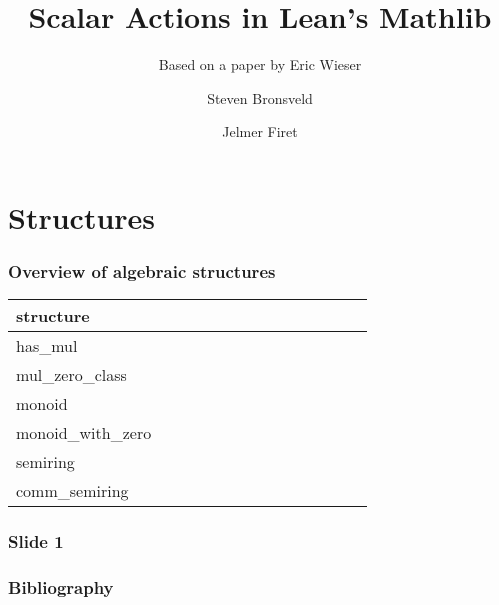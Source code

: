 \documentclass{beamer}
\author{Steven Bronsveld \and Jelmer Firet}
\title[Scalar Actions]{Scalar Actions in Lean's Mathlib}
\subtitle{Based on a paper by Eric Wieser\cite{wieserScalarActionsLean2021}}
\institute[Radboud University Nijmegen]{Radboud University Nijmegen}
\begin{document}
	\begin{frame}[t]
	\titlepage
	\end{frame}

	\section*{Structures} %
	\label{sec:structures}
	\begin{frame}
		\frametitle{Overview of algebraic structures}
		\begin{tabular}{l*{13}{@{}c}}
			structure &  &  &  &  &  &  & &  &  &  &  & \\
			\hline
			has\_mul &&&& \checkmark\\
			mul\_zero\_class &\checkmark&&&\checkmark& \checkmark\\
			monoid &&\checkmark&&\checkmark&&\checkmark& \checkmark\\
			monoid\_with\_zero &\checkmark&\checkmark&&\checkmark&\checkmark&\checkmark& \checkmark\\
			semiring &\checkmark&\checkmark&\checkmark&\checkmark&\checkmark&\checkmark&\checkmark&\checkmark&\checkmark&\checkmark& \checkmark\\
			comm\_semiring &\checkmark&\checkmark&\checkmark&\checkmark&\checkmark&\checkmark&\checkmark&\checkmark&\checkmark&\checkmark&\checkmark& \checkmark\\
		\end{tabular}
	\end{frame}
	
	\begin{frame}[t]
	\frametitle{Slide 1}
		
	\end{frame}


	\begin{frame}[t]
	\frametitle{Bibliography}
		\printbibliography
	\end{frame}
\end{document}
